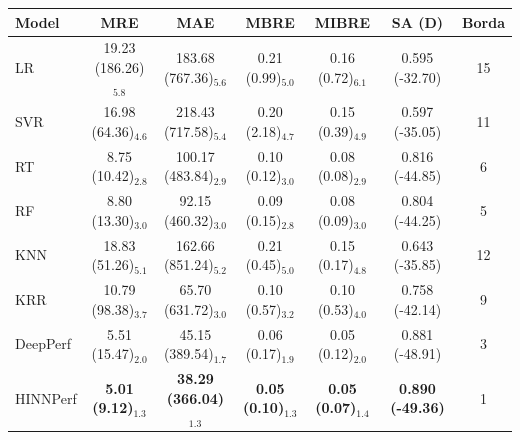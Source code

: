 \begin{tabular}{lcccccc}
\toprule
Model & MRE & MAE & MBRE & MIBRE & SA (D) & Borda \\
\midrule
LR & 19.23 (186.26)$_{5.8}$ & 183.68 (767.36)$_{5.6}$ & 0.21 (0.99)$_{5.0}$ & 0.16 (0.72)$_{6.1}$ & 0.595 (-32.70) & 15 \\
SVR & 16.98 (64.36)$_{4.6}$ & 218.43 (717.58)$_{5.4}$ & 0.20 (2.18)$_{4.7}$ & 0.15 (0.39)$_{4.9}$ & 0.597 (-35.05) & 11 \\
RT & 8.75 (10.42)$_{2.8}$ & 100.17 (483.84)$_{2.9}$ & 0.10 (0.12)$_{3.0}$ & 0.08 (0.08)$_{2.9}$ & 0.816 (-44.85) & 6 \\
RF & 8.80 (13.30)$_{3.0}$ & 92.15 (460.32)$_{3.0}$ & 0.09 (0.15)$_{2.8}$ & 0.08 (0.09)$_{3.0}$ & 0.804 (-44.25) & 5 \\
KNN & 18.83 (51.26)$_{5.1}$ & 162.66 (851.24)$_{5.2}$ & 0.21 (0.45)$_{5.0}$ & 0.15 (0.17)$_{4.8}$ & 0.643 (-35.85) & 12 \\
KRR & 10.79 (98.38)$_{3.7}$ & 65.70 (631.72)$_{3.0}$ & 0.10 (0.57)$_{3.2}$ & 0.10 (0.53)$_{4.0}$ & 0.758 (-42.14) & 9 \\
DeepPerf & 5.51 (15.47)$_{2.0}$ & 45.15 (389.54)$_{1.7}$ & 0.06 (0.17)$_{1.9}$ & 0.05 (0.12)$_{2.0}$ & 0.881 (-48.91) & 3 \\
HINNPerf & \textbf{5.01 (9.12)$_{1.3}$} & \textbf{38.29 (366.04)$_{1.3}$} & \textbf{0.05 (0.10)$_{1.3}$} & \textbf{0.05 (0.07)$_{1.4}$} & \textbf{0.890 (-49.36)} & 1 \\
\bottomrule
\end{tabular}
